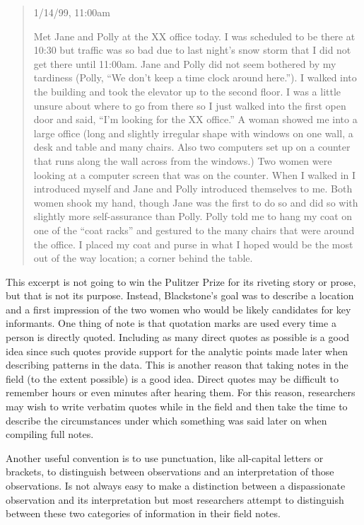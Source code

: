 \begin{quote}
	
1/14/99, 11:00am

Met Jane and Polly at the XX office today. I was scheduled to be there at 10:30 but traffic was so bad due to last night's snow storm that I did not get there until 11:00am. Jane and Polly did not seem bothered by my tardiness (Polly, ``We don't keep a time clock around here.''). I walked into the building and took the elevator up to the second floor. I was a little unsure about where to go from there so I just walked into the first open door and said, ``I'm looking for the XX office.'' A woman showed me into a large office (long and slightly irregular shape with windows on one wall, a desk and table and many chairs. Also two computers set up on a counter that runs along the wall across from the windows.) Two women were looking at a computer screen that was on the counter. When I walked in I introduced myself and Jane and Polly introduced themselves to me. Both women shook my hand, though Jane was the first to do so and did so with slightly more self-assurance than Polly. Polly told me to hang my coat on one of the ``coat racks'' and gestured to the many chairs that were around the office. I placed my coat and purse in what I hoped would be the most out of the way location; a corner behind the table.

\end{quote}

This excerpt is not going to win the Pulitzer Prize for its riveting story or prose, but that is not its purpose. Instead, Blackstone's goal was to describe a location and a first impression of the two women who would be likely candidates for key informants. One thing of note is that quotation marks are used every time a person is directly quoted. Including as many direct quotes as possible is a good idea since such quotes provide support for the analytic points made later when describing patterns in the data. This is another reason that taking notes in the field (to the extent possible) is a good idea. Direct quotes may be difficult to remember hours or even minutes after hearing them. For this reason, researchers may wish to write verbatim quotes while in the field and then take the time to describe the circumstances under which something was said later on when compiling full notes.

Another useful convention is to use punctuation, like all-capital letters or brackets, to distinguish between observations and an interpretation of those observations. Is not always easy to make a distinction between a dispassionate observation and its interpretation but most researchers attempt to distinguish between these two categories of information in their field notes.

